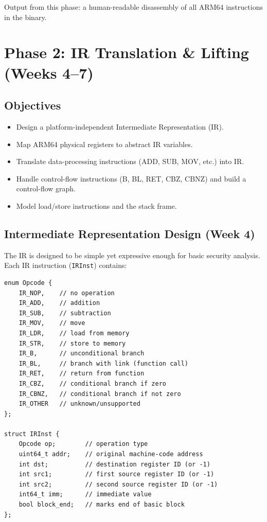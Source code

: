 \documentclass[12pt,a4paper]{article}
\begin{document}
Output from this phase: a human-readable disassembly of all ARM64 instructions in the binary.

\newpage

\section{Phase 2: IR Translation \& Lifting (Weeks 4--7)}

\subsection{Objectives}

\begin{itemize}
  \item Design a platform-independent Intermediate Representation (IR).
  \item Map ARM64 physical registers to abstract IR variables.
  \item Translate data-processing instructions (ADD, SUB, MOV, etc.) into IR.
  \item Handle control-flow instructions (B, BL, RET, CBZ, CBNZ) and build a control-flow graph.
  \item Model load/store instructions and the stack frame.
\end{itemize}

\subsection{Intermediate Representation Design (Week 4)}

The IR is designed to be simple yet expressive enough for basic security analysis. Each IR instruction (\texttt{IRInst}) contains:

\begin{lstlisting}
enum Opcode {
    IR_NOP,    // no operation
    IR_ADD,    // addition
    IR_SUB,    // subtraction
    IR_MOV,    // move
    IR_LDR,    // load from memory
    IR_STR,    // store to memory
    IR_B,      // unconditional branch
    IR_BL,     // branch with link (function call)
    IR_RET,    // return from function
    IR_CBZ,    // conditional branch if zero
    IR_CBNZ,   // conditional branch if not zero
    IR_OTHER   // unknown/unsupported
};

struct IRInst {
    Opcode op;        // operation type
    uint64_t addr;    // original machine-code address
    int dst;          // destination register ID (or -1)
    int src1;         // first source register ID (or -1)
    int src2;         // second source register ID (or -1)
    int64_t imm;      // immediate value
    bool block_end;   // marks end of basic block
};
\end{lstlisting}
\end{document}
